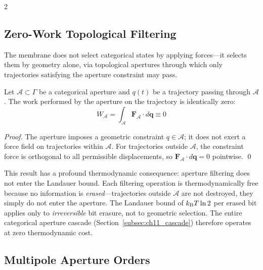 \begin{multicols}{2}

\subsection{Zero-Work Topological Filtering}

The membrane does not select categorical states by applying forces---it selects them by geometry alone, via topological apertures through which only trajectories satisfying the aperture constraint may pass.

\begin{theorem}
\label{thm:zero_work}
Let $\mathcal{A} \subset \Gamma$ be a categorical aperture and $q(t)$ be a trajectory passing through $\mathcal{A}$. The work performed by the aperture on the trajectory is identically zero:
\begin{equation}
W_{\mathcal{A}} = \int_{\mathcal{A}} \mathbf{F}_{\mathcal{A}} \cdot d\mathbf{q} \equiv 0
\label{eq:ch11_zerowork}
\end{equation}
\end{theorem}

\begin{proof}
The aperture imposes a geometric constraint $q \in \mathcal{A}$; it does not exert a force field on trajectories within $\mathcal{A}$. For trajectories outside $\mathcal{A}$, the constraint force is orthogonal to all permissible displacements, so $\mathbf{F}_{\mathcal{A}} \cdot d\mathbf{q} = 0$ pointwise. \qed
\end{proof}

This result has a profound thermodynamic consequence: aperture filtering does not enter the Landauer bound. Each filtering operation is thermodynamically free because no information is \emph{erased}---trajectories outside $\mathcal{A}$ are not destroyed, they simply do not enter the aperture. The Landauer bound of $k_{\mathrm{B}} T \ln 2$ per erased bit applies only to \emph{irreversible} bit erasure, not to geometric selection. The entire categorical aperture cascade (Section~\ref{subsec:ch11_cascade}) therefore operates at zero thermodynamic cost.

\subsection{Multipole Aperture Orders}


\end{multicols}
